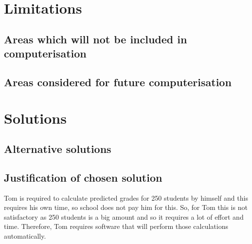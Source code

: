\section{Limitations}

\subsection{Areas which will not be included in computerisation}
\subsection{Areas considered for future computerisation}

\section{Solutions}

\subsection{Alternative solutions}

\subsection{Justification of chosen solution}

Tom is required to calculate predicted grades for 250 students by himself and this requires his own time, so school does not pay him for this. So, for Tom this is not satisfactory as 250 students is a big amount and so it requires a lot of effort and time. Therefore, Tom requires software that will perform those calculations automatically. 



